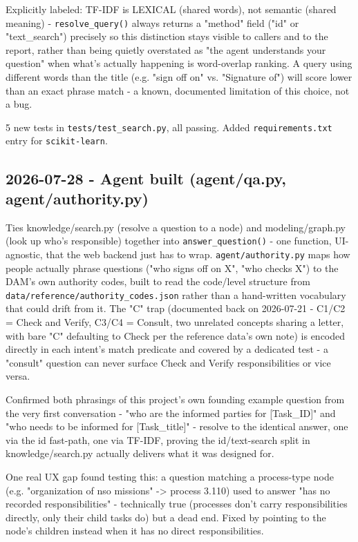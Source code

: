 Explicitly labeled: TF-IDF is LEXICAL (shared words), not semantic (shared meaning) - \texttt{resolve\_\allowbreak{}query()} always returns a "method" field ("id" or "text\_search") precisely so this distinction stays visible to callers and to the report, rather than being quietly overstated as "the agent understands your question" when what's actually happening is word-overlap ranking. A query using different words than the title (e.g. "sign off on" vs. "Signature of") will score lower than an exact phrase match - a known, documented limitation of this choice, not a bug.

5 new tests in \texttt{tests/\allowbreak{}test\_\allowbreak{}search.py}, all passing. Added \texttt{requirements.txt} entry for \texttt{scikit-learn}.

\subsection*{2026-07-28 - Agent built (agent/qa.py, agent/authority.py)}
Ties knowledge/search.py (resolve a question to a node) and modeling/graph.py (look up who's responsible) together into \texttt{answer\_\allowbreak{}question()} - one function, UI-agnostic, that the web backend just has to wrap. \texttt{agent/\allowbreak{}authority.py} maps how people actually phrase questions ("who signs off on X", "who checks X") to the DAM's own authority codes, built to read the code/level structure from \texttt{data/\allowbreak{}reference/\allowbreak{}authority\_\allowbreak{}codes.json} rather than a hand-written vocabulary that could drift from it. The "C" trap (documented back on 2026-07-21 - C1/C2 = Check and Verify, C3/C4 = Consult, two unrelated concepts sharing a letter, with bare "C" defaulting to Check per the reference data's own note) is encoded directly in each intent's match predicate and covered by a dedicated test - a "consult" question can never surface Check and Verify responsibilities or vice versa.

Confirmed both phrasings of this project's own founding example question from the very first conversation - "who are the informed parties for [Task\_ID]" and "who needs to be informed for [Task\_title]" - resolve to the identical answer, one via the id fast-path, one via TF-IDF, proving the id/text-search split in knowledge/search.py actually delivers what it was designed for.

One real UX gap found testing this: a question matching a process-type node (e.g. "organization of nso missions" -> process 3.110) used to answer "has no recorded responsibilities" - technically true (processes don't carry responsibilities directly, only their child tasks do) but a dead end. Fixed by pointing to the node's children instead when it has no direct responsibilities.

